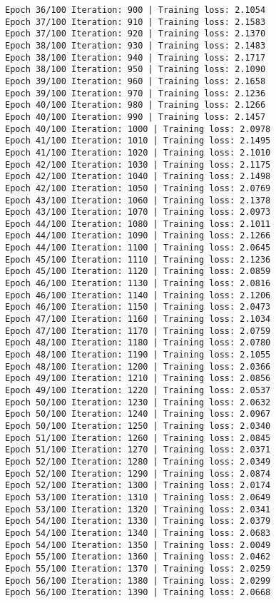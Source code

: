 \documentclass[11pt]{article}
\begin{document}
\begin{Verbatim}[commandchars=\\\{\}]
Epoch 36/100 Iteration: 900 | Training loss: 2.1054
Epoch 37/100 Iteration: 910 | Training loss: 2.1583
Epoch 37/100 Iteration: 920 | Training loss: 2.1370
Epoch 38/100 Iteration: 930 | Training loss: 2.1483
Epoch 38/100 Iteration: 940 | Training loss: 2.1717
Epoch 38/100 Iteration: 950 | Training loss: 2.1090
Epoch 39/100 Iteration: 960 | Training loss: 2.1658
Epoch 39/100 Iteration: 970 | Training loss: 2.1236
Epoch 40/100 Iteration: 980 | Training loss: 2.1266
Epoch 40/100 Iteration: 990 | Training loss: 2.1457
Epoch 40/100 Iteration: 1000 | Training loss: 2.0978
Epoch 41/100 Iteration: 1010 | Training loss: 2.1495
Epoch 41/100 Iteration: 1020 | Training loss: 2.1010
Epoch 42/100 Iteration: 1030 | Training loss: 2.1175
Epoch 42/100 Iteration: 1040 | Training loss: 2.1498
Epoch 42/100 Iteration: 1050 | Training loss: 2.0769
Epoch 43/100 Iteration: 1060 | Training loss: 2.1378
Epoch 43/100 Iteration: 1070 | Training loss: 2.0973
Epoch 44/100 Iteration: 1080 | Training loss: 2.1011
Epoch 44/100 Iteration: 1090 | Training loss: 2.1266
Epoch 44/100 Iteration: 1100 | Training loss: 2.0645
Epoch 45/100 Iteration: 1110 | Training loss: 2.1236
Epoch 45/100 Iteration: 1120 | Training loss: 2.0859
Epoch 46/100 Iteration: 1130 | Training loss: 2.0816
Epoch 46/100 Iteration: 1140 | Training loss: 2.1206
Epoch 46/100 Iteration: 1150 | Training loss: 2.0473
Epoch 47/100 Iteration: 1160 | Training loss: 2.1034
Epoch 47/100 Iteration: 1170 | Training loss: 2.0759
Epoch 48/100 Iteration: 1180 | Training loss: 2.0780
Epoch 48/100 Iteration: 1190 | Training loss: 2.1055
Epoch 48/100 Iteration: 1200 | Training loss: 2.0366
Epoch 49/100 Iteration: 1210 | Training loss: 2.0856
Epoch 49/100 Iteration: 1220 | Training loss: 2.0537
Epoch 50/100 Iteration: 1230 | Training loss: 2.0632
Epoch 50/100 Iteration: 1240 | Training loss: 2.0967
Epoch 50/100 Iteration: 1250 | Training loss: 2.0340
Epoch 51/100 Iteration: 1260 | Training loss: 2.0845
Epoch 51/100 Iteration: 1270 | Training loss: 2.0371
Epoch 52/100 Iteration: 1280 | Training loss: 2.0349
Epoch 52/100 Iteration: 1290 | Training loss: 2.0874
Epoch 52/100 Iteration: 1300 | Training loss: 2.0174
Epoch 53/100 Iteration: 1310 | Training loss: 2.0649
Epoch 53/100 Iteration: 1320 | Training loss: 2.0341
Epoch 54/100 Iteration: 1330 | Training loss: 2.0379
Epoch 54/100 Iteration: 1340 | Training loss: 2.0683
Epoch 54/100 Iteration: 1350 | Training loss: 2.0049
Epoch 55/100 Iteration: 1360 | Training loss: 2.0462
Epoch 55/100 Iteration: 1370 | Training loss: 2.0259
Epoch 56/100 Iteration: 1380 | Training loss: 2.0299
Epoch 56/100 Iteration: 1390 | Training loss: 2.0668

\end{Verbatim}
\end{document}
